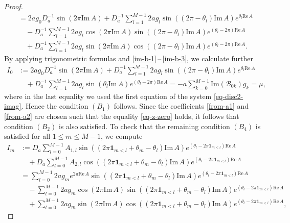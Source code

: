 \documentclass[11pt, letterpaper, reqno]{amsart}
\numberwithin{equation}{section}
\theoremstyle{definition}
\theoremstyle{plain}
\numberwithin{equation}{section}
\begin{document}
\begin{proof}
\begin{align*}
& = 2ag_{0}D_{a}^{-1}\sin(2\pi\mathrm{Im}\,A) + D_{a}^{-1}\sum_{l=1}^{M-1} 2ag_{l}\sin((2\pi-\theta_{l})\mathrm{Im}\,A)e^{\theta_{l}\mathrm{Re}\,A}  \\
&\quad - D_{a}^{-1}\sum_{l=1}^{M-1} 2ag_{l}\cos(2\pi\mathrm{Im}\,A)\sin((2\pi-\theta_{l})\mathrm{Im}\,A)e^{(\theta_{l}-2\pi)\mathrm{Re}\,A} \\
&\quad + D_{a}^{-1}\sum_{l=1}^{M-1} 2ag_{l}\sin(2\pi\mathrm{Im}\,A)\cos((2\pi - \theta_{l})\mathrm{Im}\,A)e^{(\theta_{l}-2\pi)\mathrm{Re}\,A}.
\end{align*}
By applying trigonometric formulas and \eqref{im-b-1}\,--\,\eqref{im-b-3}, we calculate further
\begin{align*}
I_{0}& := 2ag_{0}D_{a}^{-1}\sin(2\pi\mathrm{Im}\,A) + D_{a}^{-1}\sum_{l=1}^{M-1}2ag_{l}\sin((2\pi - \theta_{l})\mathrm{Im}\,A)e^{\theta_{l}\mathrm{Re}\,A} \\
& \quad +  D_{a}^{-1}\sum_{l=1}^{M-1}2ag_{l}\sin(\theta_{l}\mathrm{Im} \,A)e^{(\theta_{l}-2\pi)\mathrm{Re}\,A}  = -a\sum_{k=0}^{M-1} \mathrm{Im}(\mathcal{B}_{0k})g_{k} = \mu,
\end{align*}
where in the last equality we used the first equation of the system \eqref{eq-disc2-imag}. Hence the condition $(B_{1})$ follows. Since the coefficients \eqref{from-a1} and \eqref{from-a2} are chosen such that the equality \eqref{eq-z-zero} holds, it follows that condition $(B_{2})$ is also satisfied. To check that the remaining condition $(B_{4})$ is satisfied for all $1\le m \le M-1$, we compute
\begin{align*}
I_{m}& := D_{a}\sum_{l=0}^{M-1}A_{1,l}\sin((2\pi\mathbf{1}_{m < l}+\theta_{m}-\theta_{l})\mathrm{Im}\,A)e^{(\theta_{l} - 2\pi\mathbf{1}_{m<l})\mathrm{Re}\,A} \\
& \quad + D_{a}\sum_{l=0}^{M-1}A_{2,l}\cos((2\pi\mathbf{1}_{m<l} + \theta_{m} - \theta_{l})\mathrm{Im}\,A)e^{(\theta_{l} - 2\pi\mathbf{1}_{m<l})\mathrm{Re}\,A} \\
&  = \sum_{l=0}^{M-1}2ag_{m}e^{2\pi\mathrm{Re}\,A}\sin((2\pi\mathbf{1}_{m < l}+\theta_{m}-\theta_{l})\mathrm{Im}\,A)e^{(\theta_{l} - 2\pi\mathbf{1}_{m<l})\mathrm{Re}\,A} \\
& \quad - \sum_{l=0}^{M-1}2ag_{m}\cos(2\pi\mathrm{Im}\,A)\sin((2\pi\mathbf{1}_{m < l}+\theta_{m}-\theta_{l})\mathrm{Im}\,A)e^{(\theta_{l} - 2\pi\mathbf{1}_{m<l})\mathrm{Re}\,A} \\
& \quad + \sum_{l=0}^{M-1}2ag_{m}\sin(2\pi\mathrm{Im}\,A)\cos((2\pi\mathbf{1}_{m<l} + \theta_{m} - \theta_{l})\mathrm{Im}\,A)e^{(\theta_{l} - 2\pi\mathbf{1}_{m<l})\mathrm{Re}\,A},

\end{align*}
\end{proof}
\end{document}
